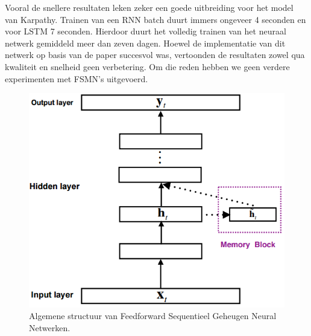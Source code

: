 Vooral de snellere resultaten leken zeker een goede uitbreiding voor het model van Karpathy. Trainen van een RNN batch duurt immers ongeveer 4 seconden en voor LSTM 7 seconden. Hierdoor duurt het volledig trainen van het neuraal netwerk gemiddeld meer dan zeven dagen.
Hoewel de implementatie van dit netwerk op basis van de paper succesvol was, vertoonden de resultaten zowel qua kwaliteit en snelheid geen verbetering. Om die reden hebben we geen verdere experimenten met FSMN's uitgevoerd.

\begin{figure}[tb]
	\centering
	\includegraphics[width=\linewidth]{Images/FSMN}
	\caption{Algemene structuur van Feedforward Sequentieel Geheugen Neural Netwerken.}
	\label{fig:fsmn}
\end{figure}
